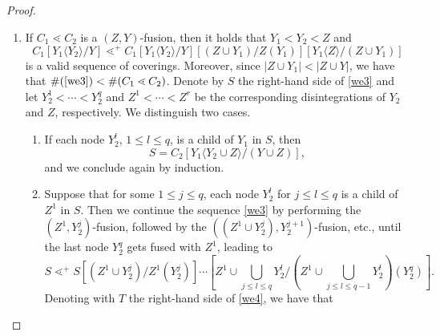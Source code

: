 \documentclass{article}
\theoremstyle{plain}
\theoremstyle{definition}
\begin{document}
\begin{proof}
\begin{enumerate}
\begin{enumerate}
we define the desired sequence $P'$ by prefixing $Q'$ with \eqref{we1}. The inequality $\#(P')<\#(P)$ follows immediately.
 
 
\item If $Y_2^1<\cdots <Y_2^q$ is the disintegration of $Y_2$ in $D:=C_1[Y_1\langle Y_2 \rangle /Y]$ and if $Z$ is a child of $Y_2^1$, then
\begin{equation}
D \lessdot^+ D[(Y_2^1\!\cup\! Z)/Y_2^1(Z)][Z\langle Y_2^1\rangle/(Y_2^1\!\cup\! Z)][(Y_1\!\cup\! Z)/Y_1(Z)]
\end{equation}\label{we2}
is a valid sequence of coverings. In addition, since $|Y_2^1\cup Z|<|Y\cup Z|$ and $|Y_1\cup Z|<|Y\cup Z|$ it holds that $\#(\eqref{we2})<\#(C_1\lessdot C_2)$. 
 We conclude again by induction, analogously as in the previous case, noticing that the last construct in \eqref{we2} is precisely $C_2[(Z\cup Y_1)\langle Y_2\rangle/(Y\cup Z)]$.
\end{enumerate}
\item If $C_1\lessdot C_2$ is a $(Z,Y)$-fusion, then it holds that $Y_1<Y_2<Z$ and
\begin{equation} 
 C_1[Y_1\langle Y_2 \rangle /Y] \lessdot^+ C_1[Y_1\langle Y_2 \rangle /Y][(Z\cup Y_1)/Z(Y_1)][Y_1\langle Z\rangle / (Z\cup Y_1)] \label{we3}
\end{equation}
is a valid sequence of coverings. Moreover, since $|Z\cup Y_1|<|Z\cup Y|$, we have that $\#(\eqref{we3})<\#(C_1\lessdot C_2)$. Denote by $S$ the right-hand side of \eqref{we3} and let $Y_2^1<\cdots <Y_2^q$ and $Z^1<\cdots <Z^r$ be the corresponding disintegrations of $Y_2$ and $Z$, respectively. We distinguish two cases.
\begin{enumerate}
\item If each node $Y_2^l$, $1\leq l\leq q$, is a child of $Y_1$ in $S$, then $$S=C_2[Y_1\langle Y_2\cup Z \rangle/(Y\cup Z)],$$ and we conclude again by induction.
\item Suppose that for some $1\leq j\leq q$, each node $Y_2^l$ for $j\leq l\leq q$ is a child of $Z^1$ in $S$. Then we continue the sequence \eqref{we3} by performing the $(Z^1,Y_2^j)$-fusion, followed by the $((Z^1\cup Y_2^j),Y_2^{j+1})$-fusion, etc., until the last node $Y_2^q$ gets fused with $Z^1$, leading to 
\begin{equation}
 S\lessdot^+ S[(Z^1\cup Y_2^j)/Z^1(Y_2^j)]\cdots[Z^1\cup\!\!\bigcup_{j\leq l\leq q}Y_2^l/ (Z^1\cup\!\!\bigcup_{j\leq l\leq q-1}Y_2^l)(Y_2^{q})].
 \label{we4}
\end{equation}
Denoting with $T$ the right-hand side of \eqref{we4}, we have that 

\end{enumerate}
\end{enumerate}
\end{proof}
\end{document}
